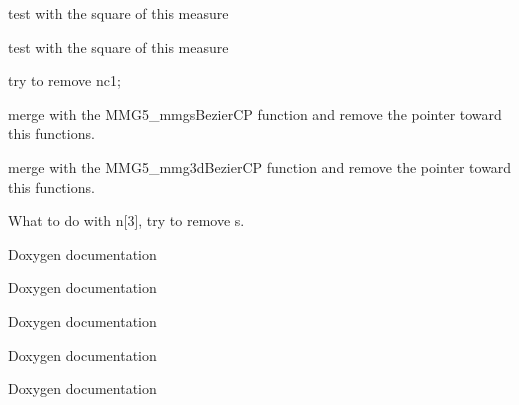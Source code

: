 \begin{DoxyRefList}
%
test with the square of this measure  
\item[Global \mbox{\hyperlink{inlined__functions__3d__private_8h_a1a1913928c768980aeda203bfd4c46d5}{MMG5\+\_\+caltet\+\_\+ani}} (MMG5\+\_\+p\+Mesh mesh, MMG5\+\_\+p\+Sol met, MMG5\+\_\+p\+Tetra pt)]\label{todo__todo000020}%
%
test with the square of this measure  
\item[Class \mbox{\hyperlink{structMMG5__Mesh}{MMG5\+\_\+\+Mesh}} ]\label{todo__todo000006}%
%
try to remove nc1;  
\item[Global \mbox{\hyperlink{libmmg3d__private_8h_ae28d21a4bbe2f684cbf9ee72015c3aba}{MMG5\+\_\+mmg3d\+Bezier\+CP}} (MMG5\+\_\+p\+Mesh mesh, \mbox{\hyperlink{structMMG5__Tria}{MMG5\+\_\+\+Tria}} $\ast$pt, MMG5\+\_\+p\+Bezier pb, int8\+\_\+t ori)]\label{todo__todo000015}%
%
merge with the MMG5\+\_\+mmgs\+Bezier\+CP function and remove the pointer toward this functions.  
\item[Global \mbox{\hyperlink{libmmgs__private_8h_a2287e71a42ef9f04aa8e68b6e9920f76}{MMG5\+\_\+mmgs\+Bezier\+CP}} (MMG5\+\_\+p\+Mesh, \mbox{\hyperlink{structMMG5__Tria}{MMG5\+\_\+\+Tria}} $\ast$, MMG5\+\_\+p\+Bezier, int8\+\_\+t ori)]\label{todo__todo000040}%
%
merge with the MMG5\+\_\+mmg3d\+Bezier\+CP function and remove the pointer toward this functions. 
\item[Class \mbox{\hyperlink{structMMG5__Point}{MMG5\+\_\+\+Point}} ]\label{todo__todo000005}%
%
What to do with n\mbox{[}3\mbox{]}, try to remove s.  
\item[File \mbox{\hyperlink{movpt__3d_8c}{movpt\+\_\+3d.c}} ]\label{todo__todo000027}%
%
Doxygen documentation  
\item[File \mbox{\hyperlink{movpt__s_8c}{movpt\+\_\+s.c}} ]\label{todo__todo000050}%
%
Doxygen documentation  
\item[File \mbox{\hyperlink{quality__s_8c}{quality\+\_\+s.c}} ]\label{todo__todo000051}%
%
Doxygen documentation  
\item[File \mbox{\hyperlink{split__3d_8c}{split\+\_\+3d.c}} ]\label{todo__todo000032}%
%
Doxygen documentation  
\item[File \mbox{\hyperlink{swapar__s_8c}{swapar\+\_\+s.c}} ]\label{todo__todo000052}%
%
Doxygen documentation  

\end{DoxyRefList}
